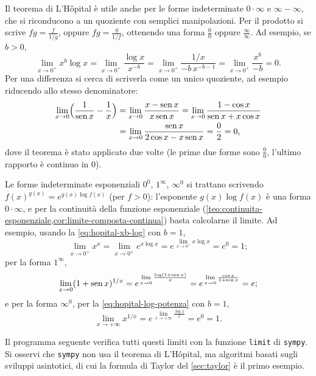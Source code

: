 Il teorema di L'Hôpital è utile anche per le forme indeterminate $0\cdot\infty$ e
$\infty-\infty$, che si riconducono a un quoziente con semplici manipolazioni. Per il
prodotto si scrive $fg=\frac{f}{1/g}$, oppure $fg=\frac{g}{1/f}$, ottenendo una forma
$\frac00$ oppure $\frac\infty\infty$. Ad esempio, se $b>0$,
\begin{equation}\label{eq:hopital-xb-log}
  \lim_{x\to0^{+}}x^{b}\log x=\lim_{x\to0^{+}}\frac{\log x}{x^{-b}}
  =\lim_{x\to0^{+}}\frac{1/x}{-b\,x^{-b-1}}=\lim_{x\to0^{+}}\frac{x^{b}}{-b}=0 .
\end{equation}
Per una differenza si cerca di scriverla come un unico quoziente, ad esempio
riducendo allo stesso denominatore:
\begin{align*}
  \lim_{x\to0}\Bigl(\frac1{\operatorname{sen} x}-\frac1x\Bigr)&=\lim_{x\to0}\frac{x-\operatorname{sen} x}{x\operatorname{sen} x}
  =\lim_{x\to0}\frac{1-\cos x}{\operatorname{sen} x+x\cos x}\\
  &=\lim_{x\to0}\frac{\operatorname{sen} x}{2\cos x-x\operatorname{sen} x}=\frac02=0,
\end{align*}
dove il teorema è stato applicato due volte (le prime due forme sono $\frac00$, l'ultimo
rapporto è continuo in $0$).

Le forme indeterminate esponenziali $0^{0}$, $1^{\infty}$, $\infty^{0}$ si trattano
scrivendo $f(x)^{g(x)}=e^{g(x)\log f(x)}$ (per $f>0$): l'esponente $g(x)\log f(x)$ è una
forma $0\cdot\infty$, e per la continuità della funzione esponenziale
(\cref{teo:continuita-esponenziale,cor:limite-composta-continua}) basta calcolarne il
limite. Ad esempio, usando la \eqref{eq:hopital-xb-log} con $b=1$,
\begin{equation}\label{eq:hopital-xx}
  \lim_{x\to0^{+}}x^{x}=\lim_{x\to0^{+}}e^{x\log x}=e^{\,\lim_{x\to0^{+}}x\log x}=e^{0}=1 ;
\end{equation}
per la forma $1^{\infty}$,
\begin{equation}\label{eq:hopital-1-infinito}
  \lim_{x\to0}(1+\operatorname{sen} x)^{1/x}=e^{\,\lim\limits_{x\to0}\frac{\log(1+\operatorname{sen} x)}{x}}
  =e^{\,\lim\limits_{x\to0}\frac{\cos x}{1+\operatorname{sen} x}}=e ;
\end{equation}
e per la forma $\infty^{0}$, per la \eqref{eq:hopital-log-potenza} con $b=1$,
\[
  \lim_{x\to+\infty}x^{1/x}=e^{\,\lim\limits_{x\to+\infty}\frac{\log x}{x}}=e^{0}=1 .
\]

Il programma seguente verifica tutti questi limiti con la funzione \texttt{limit} di
\texttt{sympy}. Si osservi che \texttt{sympy} non usa il teorema di L'Hôpital, ma
algoritmi basati sugli sviluppi asintotici, di cui la formula di Taylor del
\cref{sec:taylor} è il primo esempio.

